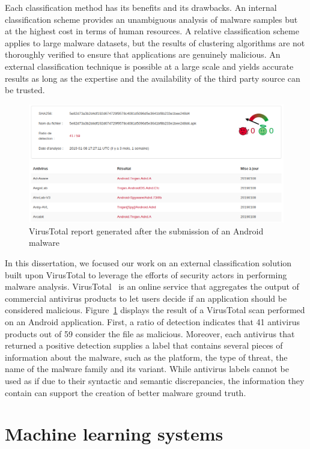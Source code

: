 Each classification method has its benefits and its drawbacks.
An internal classification scheme provides an unambiguous analysis of malware samples but at the highest cost in terms of human resources.
A relative classification scheme applies to large malware datasets, but the results of clustering algorithms are not thoroughly verified to ensure that applications are genuinely malicious.
An external classification technique is possible at a large scale and yields accurate results as long as the expertise and the availability of the third party source can be trusted.

\begin{figure}[!ht]
        \centering
	\includegraphics[width=0.9\linewidth]{figures/background/virustotal.png}
	\caption{VirusTotal report generated after the submission of an Android malware}
	\label{figure:background:virustotal}
\end{figure}

In this dissertation, we focused our work on an external classification solution built upon VirusTotal to leverage the efforts of security actors in performing malware analysis.
VirusTotal~\cite{noauthor_virustotal_nodate} is an online service that aggregates the output of commercial antivirus products to let users decide if an application should be considered malicious.
Figure~\ref{figure:background:virustotal} displays the result of a VirusTotal scan performed on an Android application.
First, a ratio of detection indicates that 41 antivirus products out of 59 consider the file as malicious.
Moreover, each antivirus that returned a positive detection supplies a label that contains several pieces of information about the malware, such as the platform, the type of threat, the name of the malware family and its variant.
While antivirus labels cannot be used as if due to their syntactic and semantic discrepancies, the information they contain can support the creation of better malware ground truth.
\section{Machine learning systems}
